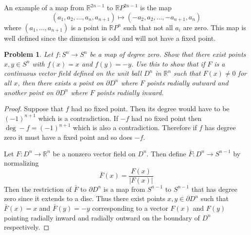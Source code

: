 \documentclass[10pt]{article}
\newcommand{\sk}{\vskip 10mm}
\newcommand{\bb}[1]{\mathbb{#1}}
\theoremstyle{plain}
\newtheorem{problem}{Problem}
\theoremstyle{remark}
\begin{document}
An example of a map from $\bb{R}^{2n-1}$ to $\bb{R}P^{2n-1}$ is
the map
\[
  (a_1,a_2,\ldots,a_n,a_{n+1})\mapsto (-a_2,a_2,\ldots,-a_{n+1},a_n)
\]
where $(a_1,\ldots, a_{n+1})$ is a point in $\bb{R}P^n$ such
that not all $a_i$ are zero. This map is well defined since
the dimension is odd and will not have a fixed point.

\sk

\begin{problem}
  Let $f:S^n\rightarrow S^n$ be a map of degree zero. Show that there exist
  points $x,y\in S^n$ with $f(x)=x$ and $f(y)=-y$. Use this to show
  that if $F$ is a continuous vector field defined on the unit
  ball $D^n$ in $\bb{R}^n$ such that $F(x)\neq 0$ for all $x$, then
  there exists a point on $\partial D^n$ where $F$ points radially outward
  and another point on $\partial D^n$ where $F$ points radially inward.
\end{problem}

\begin{proof}
  Suppose that $f$ had no fixed point. Then its degree would have to be
  $(-1)^{n+1}$ which is a contradiction. If $-f$ had no fixed point then
  $\deg -f=(-1)^{n+1}$ which is also a contradiction. Therefore if $f$
  has degree zero it must have a fixed point and so does $-f$.

  Let $F:D^n\rightarrow\bb{R}^n$ be a nonzero vector field on $D^n$. Then define
  $\bar{F}:D^n\rightarrow S^{n-1}$ by normalizing
  \[
    \bar{F}(x)=\frac{F(x)}{|F(x)|}
  \]
  Then the restriction of $\bar{F}$ to $\partial D^n$ is a map from $S^{n-1}$
  to $S^{n-1}$ that has degree zero since it extends to a disc. Thus
  there exist points $x,y\in \partial D^n$ such that $\bar{F}(x)=x$ and $\bar{F}(y)=-y$
  corresponding to a vector $F(x)$ and $F(y)$ pointing radially inward and
  radially outward on the boundary of $D^n$ respectively.
\end{proof}

\end{document}
